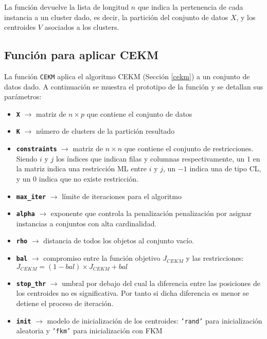 La función devuelve la lista de longitud $n$ que indica la pertenencia de cada instancia a un cluster dado, es decir, la partición del conjunto de datos $X$, y los centroides $V$ asociados a los clusters.

\subsection{Función para aplicar CEKM}

La función \texttt{CEKM} aplica el algoritmo \acs{CEKM} (Sección \ref{cekm}) a un conjunto de datos dado. A continuación se muestra el prototipo de la función y se detallan sus parámetros:


\begin{itemize}
	
	\item \textbf{\texttt{X}} {$\longrightarrow$ matriz de $n \times p$ que contiene el conjunto de datos}
	
	\item \textbf{\texttt{K}} {$\longrightarrow$ número de clusters de la partición resultado}
	
	\item \textbf{\texttt{constraints}} {$\longrightarrow$ matriz de $n \times n$ que contiene el conjunto de restricciones. Siendo $i$ y $j$ los índices que indican filas y columnas respectivamente, un $1$ en la matriz indica una restricción \acs{ML} entre $i$ y $j$, un $-1$ indica una de tipo \acs{CL}, y un $0$ indica que no existe restricción.}
	
	\item \textbf{\texttt{max\_iter}} {$\longrightarrow$ límite de iteraciones para el algoritmo}
	
	\item \textbf{\texttt{alpha}} {$\longrightarrow$ exponente que controla la penalización penalización por asignar instancias a conjuntos con alta cardinalidad.}
	
	\item \textbf{\texttt{rho}} {$\longrightarrow$ distancia de todos los objetos al conjunto vacío.}
	
	\item \textbf{\texttt{bal}} {$\longrightarrow$ compromiso entre la función objetivo $J_{CEKM}$ y las restricciones: $J_{CEKM} = (1-bal) \times J_{CEKM} + bal$}
	
	\item \textbf{\texttt{stop\_thr}} {$\longrightarrow$ umbral por debajo del cual la diferencia entre las posiciones de los centroides no es significativa. Por tanto si dicha diferencia es menor se detiene el proceso de iteración.}
	
	\item \textbf{\texttt{init}} {$\longrightarrow$ modelo de inicialización de los centroides: \texttt{'rand'} para inicialización aleatoria y \texttt{'fkm'} para inicialización con \acf{FKM}}
	
\end{itemize}


